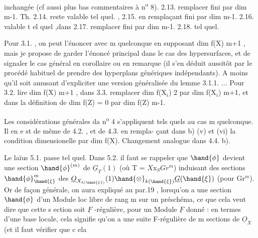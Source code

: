 
inchangée (cf aussi plus bas commentaires à n\textsuperscript{o} 8). 2.13. remplacer fini
par dim \hand{$\leqslant$} m-1. Th. 2.14. reste valable tel quel. , 2.15. en
remplaçant fini par dim \hand{$\leqslant$} m-1. 2.16. valable t el quel ,dans
 2.17. remplacer fini par dim \hand{$\leqslant$} m-1. 2.18. tel quel.

Pour 3.1. , on peut l'énoncer avec m quelconque en supposant
dim f(X) \hand{$\geqslant$} m+1 , mais je propose de garder l'énoncé principal dans
le cas des hypersurfaces, et de signaler le cas général en corollaire
ou en remarque (il s'en déduit aussitôt par le procédé habituel de
prendre des hyperplans génériques indépendants). A moins qu'il soit
amusant d'expliciter une version généralisée du lemme 3.1.1. ...
Pour 3.2. lire dim f(X)\hand{$\geqslant$} m+1 , dans 3.3. remplacer dim f(X$_i$) \hand{$\geqslant$} 2
par dim f(X$_i$)\hand{$\geqslant$} m+1, et dans la définition de  dim f(Z) = 0
par dim f(Z) \hand{$\leqslant$} m-1.

Les considérations générales da n\textsuperscript{o} 4 s'appliquent tels quels
au cas m quelconque. Il en e st de même de 4.2. , et de 4.3. en rempla-%
çant dans b) (v) et (vi) la condition dimensionelle par
dim f(X). Changement analogue dans 4.4. b).

Le laïus 5.1. passe tel quel. Dans 5.2. il faut se rappeler
que $\hand{\phi}$ devient une section $\hand{\phi}^{(m)}$ de $\underline{G}_T(1)$ (où T 
 = $X\mathrm{x}_S Gr^m$)  induisant des sections
$\hand{\phi}^m_{\hand{\xi}}$ des   $\underline{O}_{X_{k(\hand{\xi})}}(1)\hand{\otimes}_{k(\hand{\xi})}\underline{G}(\hand{\xi})$ (pour \hand{$\xi \in$} Gr$^m$). Or
de façon générale, on aura expliqué au par.19 , lorsqu'on a une
\placedmargin{$\|$} section $\hand{\phi}$ d'un Module loc libre de rang m sur un préschéma, ce que
cela veut dire que cette s ection soit $\underline{F}$ -régulière, pour un Module
$\underline{F}$ donné : en termes d'une base locale, cela signifie qu'on a une
suite F-régulière de m sections de $\underline{O}_X$ (et il faut vérifier que c ela

